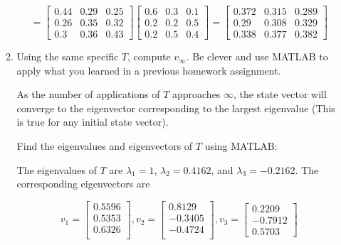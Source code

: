 \documentclass[fleqn]{article}
\begin{document}
\begin{enumerate}[nolistsep]
\begin{enumerate}
			\begin{equation*}
				= \begin{bmatrix}
					0.44 & 0.29 & 0.25\\
					0.26 & 0.35 & 0.32\\
					0.3  & 0.36 & 0.43
				\end{bmatrix}\begin{bmatrix}
					0.6 & 0.3 & 0.1\\
					0.2 & 0.2 & 0.5\\
					0.2 & 0.5 & 0.4
				\end{bmatrix} = \pmb{\begin{bmatrix}
					0.372 & 0.315 & 0.289\\
					0.29  & 0.308 & 0.329\\
					0.338 & 0.377 & 0.382
				\end{bmatrix}}
			\end{equation*}
			
			\item Using the same specific $T$, compute $v_{\infty}$. Be clever and use MATLAB to apply what you learned in a previous homework assignment.
			
			As the number of applications of $T$ approaches $\infty$, the state vector will converge to the eigenvector corresponding to the largest eigenvalue (This is true for any initial state vector).
			
			Find the eigenvalues and eigenvectors of $T$ using MATLAB:
			
			The eigenvalues of $T$ are $\lambda_1 = 1$, $\lambda_2 = 0.4162$, and $\lambda_3 = -0.2162$. The corresponding eigenvectors are
			
			\begin{equation*}
				v_1 = \begin{bmatrix}
					0.5596 \\
					0.5353 \\
					0.6326 \\
				\end{bmatrix}, 
				v_2 = \begin{bmatrix}
					0.8129 \\
					-0.3405 \\
					-0.4724 \\
				\end{bmatrix},
				v_3 = \begin{bmatrix}
					0.2209 \\
					-0.7912 \\
					0.5703
				\end{bmatrix}
			\end{equation*}
				

\end{enumerate}
\end{enumerate}
\end{document}

